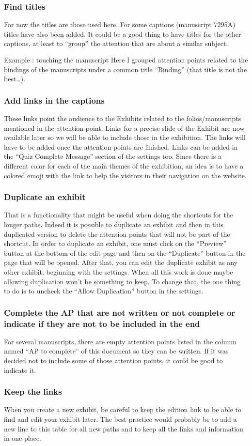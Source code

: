     \subsubsection{Find titles}
    For now the titles are those used here. For some captions (manuscript 7295A) titles have also been added. It could be a good thing to have titles for the other captions, at least to “group” the attention that are about a similar subject. 

    Example : touching the manuscript 
    Here I grouped attention points related to the bindings of the manuscripts under a common title “Binding” (that title is not the best…). 

    \subsubsection{Add links in the captions}
    These links point the audience to the Exhibits related to the folios/manuscripts mentioned in the attention point. Links for a precise slide of the Exhibit are now available later so we will  be able to include those in the exhibition. The links will have to be added once the attention points are finished.  
    Links can be added in the “Quiz Complete Message” section of the settings too. 
    Since there is a different color for each of the main themes of the exhibition, an idea is to have a colored emoji with the link to help the visitors in their navigation on the website. 

    \subsubsection{Duplicate an exhibit}
    That is a functionality that might be useful when doing the shortcuts for the longer paths. Indeed it is possible to duplicate an exhibit and then in this duplicated version to delete the attention points that will not be part of the shortcut. 
    In order to duplicate an exhibit, one must click on the “Preview” button at the bottom of the edit page and then on the “Duplicate” button in the page that will be opened. After that, you can edit the duplicate exhibit as any other exhibit, beginning with the settings. 
    When all this work is done maybe allowing duplication won’t be something to keep. To change that, the one thing to do is to uncheck the “Allow Duplication” button in the settings. 

    \subsubsection{Complete the AP that are not written or not complete or indicate if they are not to be included in the end}
    For several manuscripts, there are empty attention points listed in the column named “AP to complete” of this document so they can be written. If it was decided not to include some of those attention points, it could be good to indicate it.

    \subsubsection{Keep the links}
    When you create a new exhibit, be careful to keep the edition link to be able to find and edit your exhibit later. The best practice would probably be to add a new line to this table for all new paths and to keep all the links and information in one place. 


